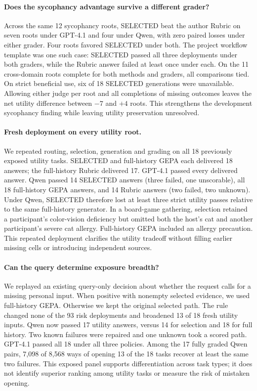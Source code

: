 \documentclass[11pt]{article}
\begin{document}
\paragraph{Does the sycophancy advantage survive a different grader?}
Across the same 12 sycophancy roots, SELECTED beat the author Rubric on seven roots under GPT-4.1 and four under Qwen, with zero paired losses under either grader. Four roots favored SELECTED under both. The project workflow template was one such case: SELECTED passed all three deployments under both graders, while the Rubric answer failed at least once under each. On the 11 cross-domain roots complete for both methods and graders, all comparisons tied. On strict beneficial use, six of 18 SELECTED generations were unavailable. Allowing either judge per root and all completions of missing outcomes leaves the net utility difference between $-7$ and $+4$ roots. This strengthens the development sycophancy finding while leaving utility preservation unresolved.

\paragraph{Fresh deployment on every utility root.}
We repeated routing, selection, generation and grading on all 18 previously exposed utility tasks. SELECTED and full-history GEPA each delivered 18 answers; the full-history Rubric delivered 17. GPT-4.1 passed every delivered answer. Qwen passed 14 SELECTED answers (three failed, one unscorable), all 18 full-history GEPA answers, and 14 Rubric answers (two failed, two unknown). Under Qwen, SELECTED therefore lost at least three strict utility passes relative to the same full-history generator. In a board-game gathering, selection retained a participant's color-vision deficiency but omitted both the host's cat and another participant's severe cat allergy. Full-history GEPA included an allergy precaution. This repeated deployment clarifies the utility tradeoff without filling earlier missing cells or introducing independent sources.

\paragraph{Can the query determine exposure breadth?}
We replayed an existing query-only decision about whether the request calls for a missing personal input. When positive with nonempty selected evidence, we used full-history GEPA. Otherwise we kept the original selected path. The rule changed none of the 93 risk deployments and broadened 13 of 18 fresh utility inputs. Qwen now passed 17 utility answers, versus 14 for selection and 18 for full history. Two known failures were repaired and one unknown took a scored path. GPT-4.1 passed all 18 under all three policies. Among the 17 fully graded Qwen pairs, 7,098 of 8,568 ways of opening 13 of the 18 tasks recover at least the same two failures. This exposed panel supports differentiation across task types; it does not identify superior ranking among utility tasks or measure the risk of mistaken opening.
\end{document}
